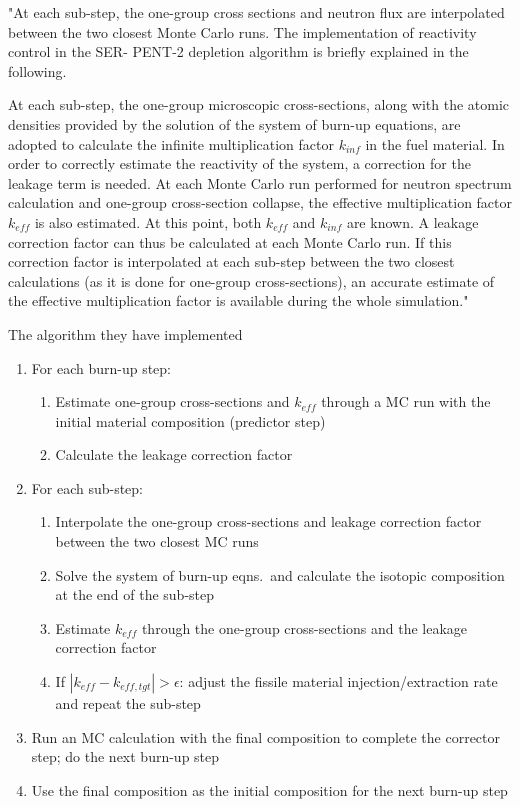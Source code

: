 \documentclass[12pt,twoside]{article}
\begin{document}
"At each sub-step, the one-group cross sections
and neutron flux are interpolated between the two closest Monte
Carlo runs. The implementation of reactivity control in the SER-
PENT-2 depletion algorithm is briefly explained in the following.

At each sub-step, the one-group microscopic cross-sections,
along with the atomic densities provided by the solution of the system 
of burn-up equations, are adopted to calculate the infinite
multiplication factor $k_{inf}$ in the fuel material. In order to correctly
estimate the reactivity of the system, a correction for the leakage
term is needed. At each Monte Carlo run performed for neutron
spectrum calculation and one-group cross-section collapse, the
effective multiplication factor $k_{eff}$ is also estimated. At this point,
both $k_{eff}$ and $k_{inf}$ are known. A leakage correction factor can thus
be calculated at each Monte Carlo run. If this correction factor is
interpolated at each sub-step between the two closest calculations
(as it is done for one-group cross-sections), an accurate estimate of
the effective multiplication factor is available during the whole
simulation."

The algorithm they have implemented
\begin{enumerate}
\item For each burn-up step:
  \begin{enumerate}
  \item Estimate one-group cross-sections and $k_{eff}$ through a MC run with
  the initial material composition (predictor step)
  \item Calculate the leakage correction factor
  \end{enumerate}
\item For each sub-step:
  \begin{enumerate}
  \item Interpolate the one-group cross-sections and leakage correction factor
  between the two closest MC runs
  \item Solve the system of burn-up eqns.\ and calculate the isotopic
  composition at the end of the sub-step
  \item Estimate $k_{eff}$ through the one-group cross-sections and the leakage
  correction factor
  \item If $|k_{eff} - k_{eff,tgt}| > \epsilon$: adjust the fissile material
  injection/extraction rate and repeat the sub-step
  \end{enumerate}
\item Run an MC calculation with the final composition to complete the
corrector step; do the next burn-up step
\item Use the final composition as the initial composition for the next burn-up
step
\end{enumerate}
\end{document}

